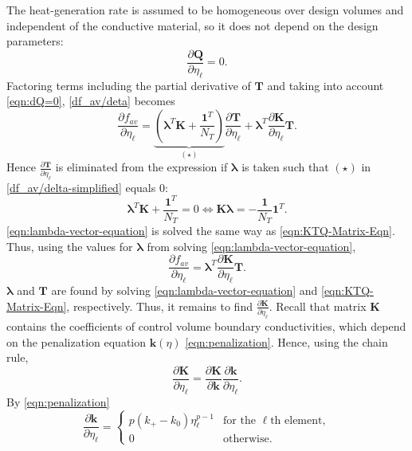 The heat-generation rate is assumed to be homogeneous over design volumes and independent of the conductive material, so it does not depend on the design parameters: 
\begin{equation}
	\frac{\partial\mathbf{Q}}{\partial\eta_{\ell}}=0.\label{eqn:dQ=0}
\end{equation}
Factoring terms including the partial derivative of $\mathbf{T}$ and taking into account \eqref{eqn:dQ=0}, \eqref{df_av/deta} becomes
\begin{equation}
	\frac{\partial f_{av}}{\partial\eta_{\ell}}=\underbrace{\left(\boldsymbol{\lambda}^T\mathbf{K}+\frac{\mathbf{1}^T}{N_T}\right)}_{(\star)}\frac{\partial\mathbf{T}}{\partial\eta_{\ell}}+\boldsymbol{\lambda}^T\frac{\partial\mathbf{K}}{\partial\eta_{\ell}}\mathbf{T}.\label{df_av/delta-simplified}
\end{equation}
Hence $\frac{\partial\mathbf{T}}{\partial\eta_{\ell}}$ is eliminated from the expression if $\boldsymbol{\lambda}$ is taken such that $(\star)$ in \eqref{df_av/delta-simplified} equals $0$:
\begin{equation}
	\boldsymbol{\lambda}^T\mathbf{K}+\frac{\mathbf{1}^T}{N_T}=0\iff\mathbf{K}\boldsymbol{\lambda}=-\frac{\mathbf{1}}{N_T}\mathbf{1}^T.\label{eqn:lambda-vector-equation}
\end{equation}
\eqref{eqn:lambda-vector-equation} is solved the same way as \eqref{eqn:KTQ-Matrix-Eqn}. Thus, using the values for $\boldsymbol{\lambda}$ from solving \eqref{eqn:lambda-vector-equation},
\begin{equation}
	\frac{\partial f_{av}}{\partial\eta_{\ell}}=\boldsymbol{\lambda}^T\frac{\partial\mathbf{K}}{\partial\eta_{\ell}}\mathbf{T}.\label{eqn:d-f_av}
\end{equation}
$\boldsymbol{\lambda}$ and $\mathbf{T}$ are found by solving \eqref{eqn:lambda-vector-equation} and \eqref{eqn:KTQ-Matrix-Eqn}, respectively. Thus, it remains to find $\frac{\partial\mathbf{K}}{\partial\eta_{\ell}}$. Recall that matrix $\mathbf{K}$ contains the coefficients of control volume boundary conductivities, which depend on the penalization equation $\mathbf{k}(\eta)$ \eqref{eqn:penalization}. Hence, using the chain rule,
\begin{equation}
	\frac{\partial\mathbf{K}}{\partial\eta_{\ell}}=\frac{\partial\mathbf{K}}{\partial\mathbf{k}}\frac{\partial\mathbf{k}}{\partial\eta_{\ell}}.\label{eqn:chain-rule}
\end{equation}
By \eqref{eqn:penalization}
\begin{equation}
	\frac{\partial\mathbf{k}}{\partial\eta_{\ell}}=
	\begin{cases}
		p\left(k_{+}-k_0\right)\eta_{\ell}^{p-1} & \text{for the }\ell\text{th element},\\
		0 & \text{otherwise}.
	\end{cases}
\end{equation}
